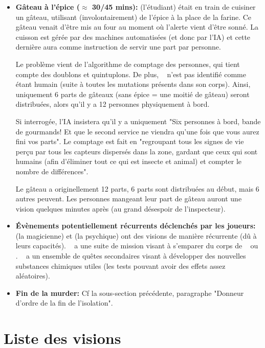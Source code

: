 {\begin{itemize}
		
		\item \textbf{Gâteau à l'épice ($\approx$ 30/45 mins):} \nmPlayerIII (l'étudiant) était en train de cuisiner un gâteau, utilisant (involontairement) de l'épice à la place de la farine. Ce gâteau venait d'être mis au four au moment où l'alerte vient d'être sonné. La cuisson est gérée par des machines automatisées (et donc par l'IA) et cette dernière aura comme instruction de servir une part par personne.
		
		\par Le problème vient de l'algorithme de comptage des personnes, qui tient compte des doublons et quintuplons. De plus, \nmPlayerX ~ n'est pas identifié comme étant humain (suite à toutes les mutations présents dans son corps). Ainsi, uniquement 6 parts de gâteaux (sans épice = une moitié de gâteau) seront distribuées, alors qu'il y a 12 personnes physiquement à bord.
		
		\par Si interrogée, l'IA insistera qu'il y a uniquement "Six personnes à bord, bande de gourmands! Et que le second service ne viendra qu'une fois que vous aurez fini vos parts". Le comptage est fait en "regroupant tous les signes de vie perçu par tous les capteurs dispersés dans la zone, gardant que ceux qui sont humains (afin d'éliminer tout ce qui est insecte et animal) et compter le nombre de différences". 
		
		\par Le gâteau a originellement 12 parts, 6 parts sont distribuées au début, mais 6 autres peuvent. Les personnes mangeant leur part de gâteau auront une vision quelques minutes après (au grand désespoir de l'inspecteur).
		
		
		\item \textbf{Évènements potentiellement récurrents déclenchés par les joueurs:} \nmPlayerVI (la magicienne) et \nmPlayerIX (la psychique) ont des visions de manière récurrente (dû à leurs capacités). \nmPlayerI ~ a une suite de mission visant à s'emparer du corps de \nmPlayerII ~ ou \nmPlayerIII. \nmPlayerXII ~ a un ensemble de quêtes secondaires visant à développer des nouvelles substances chimiques utiles (les tests pouvant avoir des effets assez aléatoires).
		
		\item \textbf{Fin de la murder:} Cf la sous-section précédente, paragraphe "Donneur d'ordre de la fin de l'isolation".
	\end{itemize}
	
	
	\section{Liste des visions}
	
}
